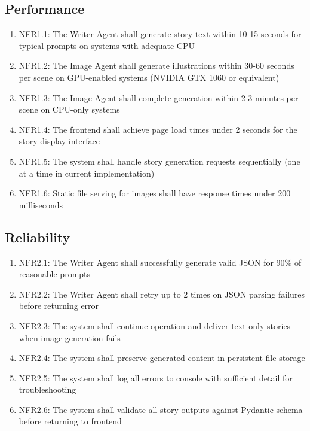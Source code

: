 \subsection{Performance}
\begin{enumerate}
    \item NFR1.1: The Writer Agent shall generate story text within 10-15 seconds for typical prompts on systems with adequate CPU
    \item NFR1.2: The Image Agent shall generate illustrations within 30-60 seconds per scene on GPU-enabled systems (NVIDIA GTX 1060 or equivalent)
    \item NFR1.3: The Image Agent shall complete generation within 2-3 minutes per scene on CPU-only systems
    \item NFR1.4: The frontend shall achieve page load times under 2 seconds for the story display interface
    \item NFR1.5: The system shall handle story generation requests sequentially (one at a time in current implementation)
    \item NFR1.6: Static file serving for images shall have response times under 200 milliseconds
\end{enumerate}

\subsection{Reliability}
\begin{enumerate}
    \item NFR2.1: The Writer Agent shall successfully generate valid JSON for 90\% of reasonable prompts
    \item NFR2.2: The Writer Agent shall retry up to 2 times on JSON parsing failures before returning error
    \item NFR2.3: The system shall continue operation and deliver text-only stories when image generation fails
    \item NFR2.4: The system shall preserve generated content in persistent file storage
    \item NFR2.5: The system shall log all errors to console with sufficient detail for troubleshooting
    \item NFR2.6: The system shall validate all story outputs against Pydantic schema before returning to frontend
\end{enumerate}

